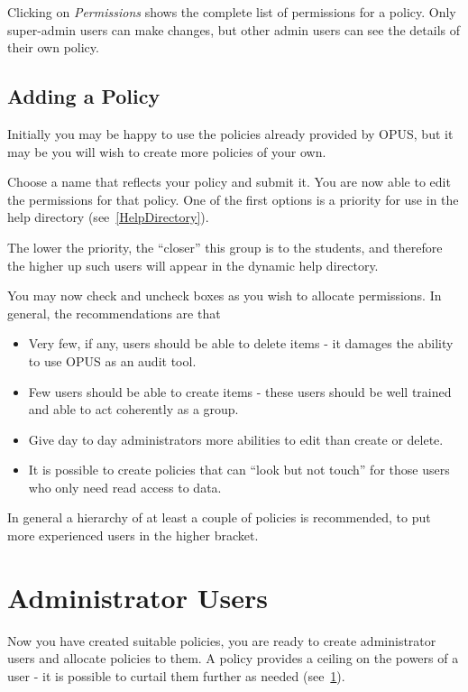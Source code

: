 \documentclass[12 pt]{book}
\begin{document}
Clicking on \emph{Permissions} shows the complete list of permissions for a
policy. Only super-admin users can make changes, but other admin users can
see the details of their own policy.

\subsection{Adding a Policy}

Initially you may be happy to use the policies already provided by OPUS, but
it may be you will wish to create more policies of your own.

Choose a name that reflects your policy and submit it. You are now able to
edit the permissions for that policy. One of the first options is a priority
for use in the help directory (see~\ref{HelpDirectory}).

The lower the priority, the 
``closer'' this group is to the students, and therefore the
higher up such users will appear in the dynamic help directory.

You may now check and uncheck boxes as you wish to allocate permissions. 
In general, the recommendations are that
\begin{itemize}
  \item Very few, if any, users should be able to delete items - it damages
    the ability to use OPUS as an audit tool.
  \item Few users should be able to create items - these users should be well
    trained and able to act coherently as a group.
  \item Give day to day administrators more abilities to edit than create or delete.
  \item It is possible to create policies that can ``look but not touch'' for those
    users who only need read access to data.
\end{itemize}

In general a hierarchy of at least a couple of policies is recommended, to put
more experienced users in the higher bracket.

\section{Administrator Users}

Now you have created suitable policies, you are ready to create administrator
users and allocate policies to them. A policy provides a ceiling on the powers
of a user - it is possible to curtail them further as needed (see~\ref{}).
\end{document}
